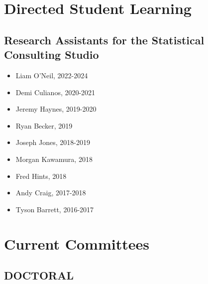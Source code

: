 \documentclass[11pt,a4paper,]{moderncv}
\providecommand{\tightlist}{%
	\setlength{\itemsep}{0pt}\setlength{\parskip}{0pt}}
\begin{document}
\endgroup

\clearpage

\section{Directed Student Learning}\label{directed-student-learning}

\subsection{\texorpdfstring{\textbf{Research Assistants for the
Statistical Consulting
Studio}}{Research Assistants for the Statistical Consulting Studio}}\label{research-assistants-for-the-statistical-consulting-studio}

\begin{itemize}
\tightlist
\item
  Liam O'Neil, 2022-2024
\item
  Demi Culianos, 2020-2021
\item
  Jeremy Haynes, 2019-2020
\item
  Ryan Becker, 2019
\item
  Joseph Jones, 2018-2019
\item
  Morgan Kawamura, 2018
\item
  Fred Hints, 2018
\item
  Andy Craig, 2017-2018
\item
  Tyson Barrett, 2016-2017
\end{itemize}

\vspace{7 mm}

\section{Current Committees}\label{current-committees}

\subsection{\texorpdfstring{\textbf{DOCTORAL}}{DOCTORAL}}\label{doctoral}
\end{document}
